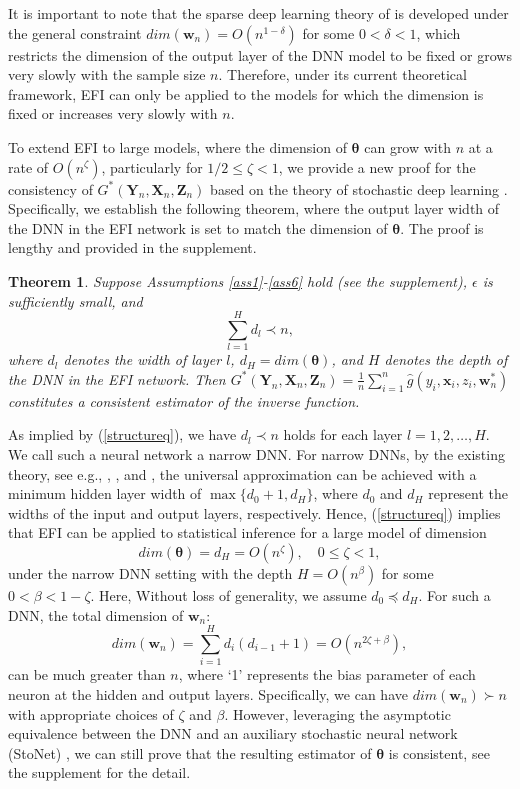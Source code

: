 \documentclass[11pt]{article}
\newcommand{\bX}{{\boldsymbol X}}
\newcommand{\bY}{{\boldsymbol Y}}
\newcommand{\bx}{{\boldsymbol x}}
\newcommand{\bZ}{{\boldsymbol Z}}
\newcommand{\bw}{{\boldsymbol w}}
\newcommand{\btheta}{{\boldsymbol \theta}}
\newtheorem{theorem}{Theorem}[section]
\begin{document}
It is important to note that the sparse deep learning theory of  \cite{SunSLiang2021} is developed under the general constraint $dim(\bw_n)=O(n^{1-\delta})$ for some $0<\delta<1$, 
which restricts the dimension of the output layer of the DNN model to be fixed or grows very slowly with the sample size $n$.
Therefore,  under its current theoretical framework, 
EFI can only be applied to the models for which the dimension is fixed or increases 
very slowly with $n$. 
 
To extend EFI to large models, where 
the dimension of $\btheta$ can grow with $n$ at a rate of $O(n^{\zeta})$, 
particularly for $1/2\leq \zeta<1$, we provide a new proof for 
the consistency of  $G^*(\bY_n,\bX_n,\bZ_n)$ based on the theory 
of stochastic deep learning \citep{LiangSLiang2022}. 
Specifically, we establish the following theorem, where the output layer width of the DNN in the EFI network is set to match the dimension of $\btheta$. The proof is lengthy and provided in the supplement.  


\begin{theorem} \label{thm:largemodel} Suppose Assumptions \ref{ass1}-\ref{ass6} hold (see the supplement), $\epsilon$ is sufficiently small, and 
\begin{equation} \label{structureq}
     \sum_{l=1}^H d_l \prec n,
 \end{equation}
 where $d_l$ denotes the width of layer $l$, $d_H=dim(\btheta)$, and $H$ denotes the depth of the DNN in the EFI network. Then $G^*(\bY_n,\bX_n,\bZ_n)= \frac{1}{n} \sum_{i=1}^n \hat{g}(y_i,\bx_i,z_i,\bw_n^*)$ constitutes a consistent estimator of the inverse function. 
\end{theorem} 

As implied by (\ref{structureq}), we have 
$d_l \prec n$ holds for each layer $l=1,2,\ldots,H$. We call such a neural network a narrow DNN. 
For narrow DNNs, by the existing theory, see e.g., \cite{Kidger2020UniversalAW}, \cite{Park2020MinimumWF}, and \cite{Kim2023MinimumWF}, 
the universal approximation can be achieved with 
a minimum hidden layer width of  
 $\max\{d_0+1, d_H\}$, where $d_0$ and $d_H$ represent the widths of 
the input and output layers, respectively.
Hence, (\ref{structureq}) implies that EFI can be applied to 
statistical inference for a large model of dimension 
\[
dim(\btheta)=d_H =O(n^{\zeta}), \quad 0 \leq \zeta<1,
\]
under the narrow DNN setting
with the depth $H=O(n^{\beta})$ for some $0<\beta<1-\zeta$. 
Here, Without loss of generality, we assume $d_0 \preceq d_H$.
For such a DNN, the total dimension of $\bw_n$: 
\[
dim(\bw_n)=\sum_{i=1}^H d_i (d_{i-1}+1) =O(n^{2\zeta+\beta}),
\]
can be much greater than $n$, where `1' represents the bias parameter of each neuron at the hidden and output layers. 
Specifically, we can have $dim(\bw_n) \succ n$ with appropriate choices of $\zeta$ and $\beta$.
However, leveraging the asymptotic equivalence between the DNN and an auxiliary stochastic neural network (StoNet) \citep{LiangSLiang2022}, we can still prove that the resulting 
estimator of $\btheta$ is consistent, see the supplement for the detail. 
\end{document}
